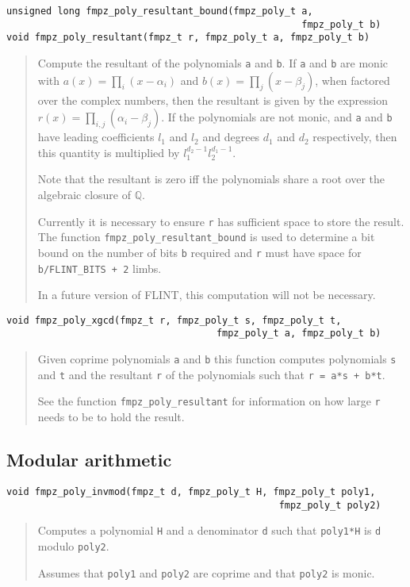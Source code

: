 \documentclass[a4paper,10pt]{article}
\newcommand{\Q}{\mathbb{Q}}
\newcommand{\code}{\lstinline}
\begin{document}
\begin{lstlisting}
unsigned long fmpz_poly_resultant_bound(fmpz_poly_t a, 
                                                    fmpz_poly_t b)
void fmpz_poly_resultant(fmpz_t r, fmpz_poly_t a, fmpz_poly_t b)
\end{lstlisting}
\begin{quote}
Compute the resultant of the polynomials \code{a} and \code{b}. If \code{a} and \code{b} are monic with $a(x) = \prod_i (x - \alpha_i)$ and $b(x) = \prod_j (x - \beta_j)$, when factored over the complex numbers, then the resultant is given by the expression $r(x) = \prod_{i,j} (\alpha_i - \beta_j)$. If the polynomials are not monic, and \code{a} and \code{b} have leading coefficients $l_1$ and $l_2$ and degrees $d_1$ and $d_2$ respectively, then this quantity is multiplied by $l_1^{d_2-1}l_2^{d_1-1}$.

Note that the resultant is zero iff the polynomials share a root over the algebraic closure of $\Q$.

Currently it is necessary to ensure \code{r} has sufficient space to store the result. The function \code{fmpz_poly_resultant_bound} is used to determine a bit bound on the number of bits \code{b} required and \code{r} must have space for \code{b/FLINT_BITS + 2} limbs.

In a future version of FLINT, this computation will not be necessary.
\end{quote}

\begin{lstlisting}
void fmpz_poly_xgcd(fmpz_t r, fmpz_poly_t s, fmpz_poly_t t, 
                                     fmpz_poly_t a, fmpz_poly_t b)
\end{lstlisting}
\begin{quote}
Given coprime polynomials \code{a} and \code{b} this function computes polynomials \code{s} and \code{t} and the resultant \code{r} of the polynomials such that \code{r = a*s + b*t}.

See the function \code{fmpz_poly_resultant} for information on how large \code{r} needs to be to hold the result.
\end{quote}

\subsection{Modular arithmetic}
\begin{lstlisting}
void fmpz_poly_invmod(fmpz_t d, fmpz_poly_t H, fmpz_poly_t poly1, 
                                                fmpz_poly_t poly2)
\end{lstlisting}
\begin{quote}
Computes a polynomial \code{H} and a denominator \code{d} such that \code{poly1*H} is \code{d} modulo \code{poly2}. 

Assumes that \code{poly1} and \code{poly2} are coprime and that \code{poly2} is monic.
\end{quote}
\end{document}
